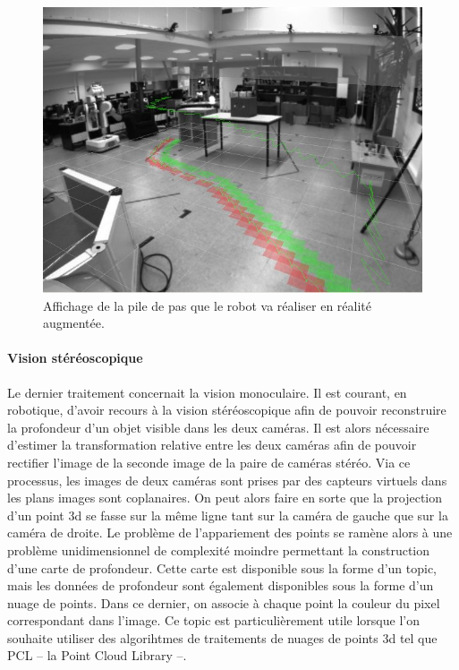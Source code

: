 \begin{figure}
  \begin{center}
    \includegraphics[width=.95\linewidth]{src/chap4-integration/footsteps2.jpg}
  \end{center}
  \caption{Affichage de la pile de pas que le robot va réaliser en
    réalité augmentée.}
\end{figure}



\paragraph{Vision stéréoscopique}


Le dernier traitement concernait la vision monoculaire. Il est
courant, en robotique, d'avoir recours à la vision stéréoscopique afin
de pouvoir reconstruire la profondeur d'un objet visible dans les deux
caméras. Il est alors nécessaire d'estimer la transformation relative
entre les deux caméras afin de pouvoir rectifier l'image de la seconde
image de la paire de caméras stéréo. Via ce processus, les images de
deux caméras sont prises par des capteurs virtuels dans les plans
images sont coplanaires. On peut alors faire en sorte que la
projection d'un point 3d se fasse sur la même ligne tant sur la caméra
de gauche que sur la caméra de droite. Le problème de l'appariement
des points se ramène alors à une problème unidimensionnel de
complexité moindre permettant la construction d'une carte de
profondeur. Cette carte est disponible sous la forme d'un topic, mais
les données de profondeur sont également disponibles sous la forme
d'un nuage de points. Dans ce dernier, on associe à chaque point la
couleur du pixel correspondant dans l'image. Ce topic est
particulièrement utile lorsque l'on souhaite utiliser des algorihtmes
de traitements de nuages de points 3d tel que PCL -- la Point Cloud
Library --.



